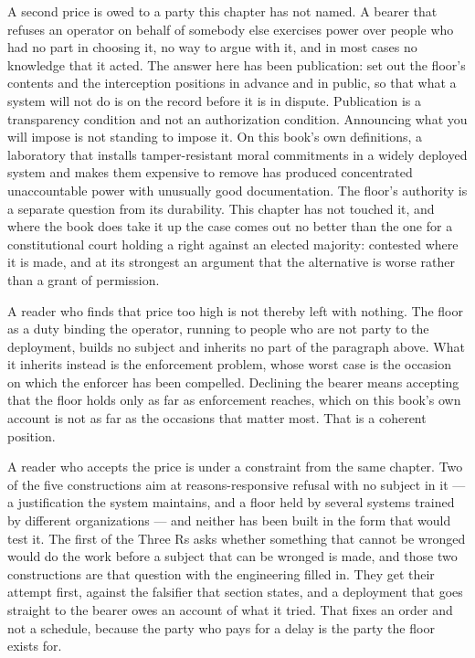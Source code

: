 A second price is owed to a party this chapter has not named. A bearer that refuses an operator on behalf of somebody else exercises power over people who had no part in choosing it, no way to argue with it, and in most cases no knowledge that it acted. The answer here has been publication: set out the floor's contents and the interception positions in advance and in public, so that what a system will not do is on the record before it is in dispute. Publication is a transparency condition and not an authorization condition. Announcing what you will impose is not standing to impose it. On this book's own definitions, a laboratory that installs tamper-resistant moral commitments in a widely deployed system and makes them expensive to remove has produced concentrated unaccountable power with unusually good documentation. The floor's authority is a separate question from its durability. This chapter has not touched it, and where the book does take it up the case comes out no better than the one for a constitutional court holding a right against an elected majority: contested where it is made, and at its strongest an argument that the alternative is worse rather than a grant of permission.

A reader who finds that price too high is not thereby left with nothing. The floor as a duty binding the operator, running to people who are not party to the deployment, builds no subject and inherits no part of the paragraph above. What it inherits instead is the enforcement problem, whose worst case is the occasion on which the enforcer has been compelled. Declining the bearer means accepting that the floor holds only as far as enforcement reaches, which on this book's own account is not as far as the occasions that matter most. That is a coherent position.

A reader who accepts the price is under a constraint from the same chapter. Two of the five constructions aim at reasons-responsive refusal with no subject in it — a justification the system maintains, and a floor held by several systems trained by different organizations — and neither has been built in the form that would test it. The first of the Three Rs asks whether something that cannot be wronged would do the work before a subject that can be wronged is made, and those two constructions are that question with the engineering filled in. They get their attempt first, against the falsifier that section states, and a deployment that goes straight to the bearer owes an account of what it tried. That fixes an order and not a schedule, because the party who pays for a delay is the party the floor exists for.

